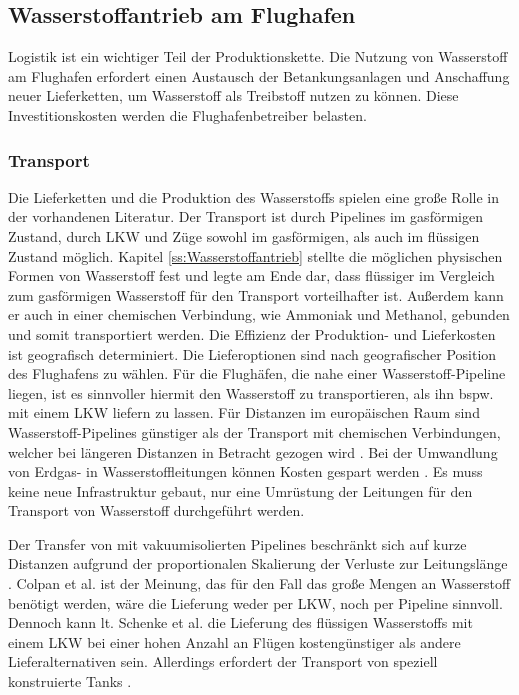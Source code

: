 \subsection{Wasserstoffantrieb am Flughafen}
Logistik ist ein wichtiger Teil der Produktionskette. 
Die Nutzung von Wasserstoff am Flughafen erfordert einen Austausch der 
Betankungsanlagen und Anschaffung neuer Lieferketten, 
um Wasserstoff als Treibstoff nutzen zu können. 
Diese Investitionskosten werden die Flughafenbetreiber belasten.
\subsubsection{Transport}
Die Lieferketten und die Produktion des Wasserstoffs spielen 
eine große Rolle in der vorhandenen Literatur.
Der Transport ist durch Pipelines im gasförmigen Zustand, 
durch LKW und Züge sowohl im gasförmigen, als auch im flüssigen Zustand möglich. 
Kapitel \ref{ss:Wasserstoffantrieb} stellte die möglichen physischen Formen 
von Wasserstoff fest und legte am Ende dar, 
dass flüssiger im Vergleich zum gasförmigen 
Wasserstoff für den Transport vorteilhafter ist. 
Außerdem kann er auch in einer chemischen Verbindung, 
wie Ammoniak und Methanol, gebunden und somit transportiert werden.
%
%
%
% 
Die Effizienz der Produktion- und Lieferkosten ist geografisch determiniert. 
Die Lieferoptionen sind nach geografischer Position des Flughafens zu wählen. 
Für die Flughäfen, die nahe einer Wasserstoff-Pipeline liegen, ist es sinnvoller
hiermit den Wasserstoff zu transportieren, als ihn bspw. mit einem LKW liefern zu lassen.
%
Für Distanzen im europäischen Raum sind Wasserstoff-Pipelines
günstiger als der Transport mit chemischen Verbindungen, 
welcher bei längeren Distanzen in Betracht gezogen wird \cite{undertaking2022strategic}. 
Bei der Umwandlung von Erdgas- in Wasserstoffleitungen können Kosten gespart werden \cite{undertaking2022strategic}. 
Es muss keine neue Infrastruktur gebaut, nur eine Umrüstung der 
Leitungen für den Transport von Wasserstoff durchgeführt werden.

Der Transfer von  mit vakuumisolierten Pipelines beschränkt sich auf kurze Distanzen
aufgrund der proportionalen Skalierung der Verluste zur Leitungslänge \cite{colpan2022fuel}.
%
Colpan et al. \cite{colpan2022fuel} ist der Meinung, 
das für den Fall das große Mengen an Wasserstoff benötigt werden, 
wäre die Lieferung weder per LKW, noch per Pipeline sinnvoll. 
%
Dennoch kann lt. Schenke et al. \cite{schenke2024lh2} die Lieferung des flüssigen Wasserstoffs 
mit einem LKW bei einer hohen Anzahl an Flügen kostengünstiger als andere Lieferalternativen sein.
Allerdings erfordert der Transport von  speziell konstruierte Tanks \cite{mulder2019outlook}.
%
%
%
